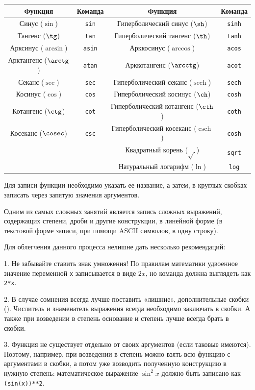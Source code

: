 \documentclass[12pt,a4paper]{article}
\begin{document}
\noindent\begin{tabular}{||c|c||c|c||}
\hline 
Функция & Команда & Функция & Команда \\ 
\hline 
Синус ($\sin$) & \texttt{sin} & Гиперболический синус ($\sh$) & \texttt{sinh}\\ 
\hline 
Тангенс ($\tg$) & \texttt{tan} &Гиперболический тангенс ($\th$) & \texttt{tanh}\\ 
\hline 
Арксинус ($\arcsin$) & \texttt{asin} & Арккосинус ($\arccos$) & \texttt{acos} \\ 
\hline 
Арктангенс ($\arctg$) & \texttt{atan} & Арккотангенс ($\arcctg$) & \texttt{acot} \\ 
\hline 
Секанс ($\sec$) & \texttt{sec} & Гиперболический секанс ($\mathop{sech}$) & \texttt{sech}\\ 
\hline 
Косинус ($\cos$) & \texttt{cos} & Гиперболический косинус ($\ch$) & \texttt{cosh} \\ 
\hline 
Котангенс ($\ctg$) & \texttt{cot} & Гиперболический котангенс ($\cth$) & \texttt{coth} \\ 
\hline 
Косеканс ($\cosec$) & \texttt{csc} & Гиперболический косеканс ($\mathop{csch}$) & \texttt{cosh} \\ 
\hline 
 &  &  Квадратный корень ($\sqrt{\ }$) & \texttt{sqrt}\\ 
\hline 
 &  &  Натуральный логарифм ($\ln$) & \texttt{log}\\
\hline 
\end{tabular} 

Для записи функции необходимо указать ее название, а затем, в круглых
скобках записать через запятую значения аргументов.

Одним из самых сложных занятий является запись сложных выражений, содержащих степени, дроби и другие конструкции, в линейной форме (в текстовой форме записи, при помощи ASCII символов, в одну строку).

Для облегчения данного процесса нелишне дать несколько рекомендаций:

1. Не забывайте ставить знак умножения! По правилам математики удвоенное значение переменной \texttt{х} записывается в виде $2x$, но команда должна выглядеть как \texttt{2*x}.

2. В случае сомнения всегда лучше поставить «лишние», дополнительные скобки (). Числитель и знаменатель выражения всегда необходимо заключать в скобки. А также при возведении в степень основание и степень лучше всегда брать
в скобки.

3. Функция не существует отдельно от своих аргументов (если таковые имеются). Поэтому, например, при возведении в степень можно взять всю функцию с аргументами в скобки, а потом уже возводить полученную конструкцию в нужную степень: математическое выражение $\sin^2x$ должно быть записано как \texttt{(sin(x))**2}.
\end{document}
